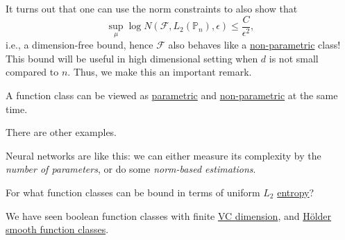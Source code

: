 It turns out that one can use the norm constraints to also show that
\[
	\sup _\mu \log N(\mathscr{F} , L_2(\mathbb{P} _n), \epsilon ) \leq \frac{C}{\epsilon ^2},
\]
i.e., a dimension-free bound, hence \(\mathscr{F} \) also behaves like a \hyperref[def:non-parametric]{non-parametric} class! This bound will be useful in high dimensional setting when \(d\) is not small compared to \(n\). Thus, we make this an important remark.

\begin{remark}
	A function class can be viewed as \hyperref[def:parametric]{parametric} and \hyperref[def:non-parametric]{non-parametric} at the same time.
\end{remark}

There are other examples.

\begin{eg}
	Neural networks are like this: we can either measure its complexity by the \emph{number of parameters}, or do some \emph{norm-based estimations}.
\end{eg}

\begin{problem*}
	For what function classes can be bound in terms of uniform \(L_2\) \hyperref[def:metric-entropy]{entropy}?
\end{problem*}
\begin{answer}
	We have seen boolean function classes with finite \hyperref[def:VC-dimension]{VC dimension}, and \hyperref[def:Holder-smooth-function-class]{Hölder smooth function classes}.
\end{answer}